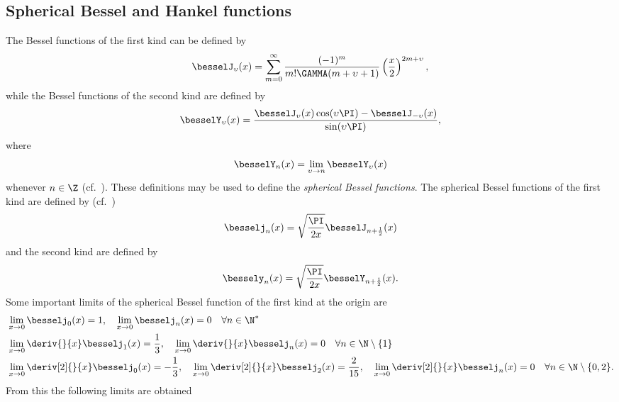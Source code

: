 \subsection{Spherical Bessel and Hankel functions}
\label{subsec:sphericalBesselAndHankel}
The Bessel functions of the first kind can be defined by~\cite[p. 360]{Abramowitz1965hom}
\begin{equation}
	\besselJ_\upsilon(x) = \sum_{m=0}^\infty \frac{(-1)^m}{m! \GAMMA(m+\upsilon+1)}\left(\frac{x}{2}\right)^{2m+\upsilon},
\end{equation}
while the Bessel functions of the second kind are defined by
\begin{equation}
	\besselY_\upsilon(x) = \frac{\besselJ_\upsilon(x) \cos(\upsilon\PI)-\besselJ_{-\upsilon}(x)}{\sin(\upsilon\PI)},
\end{equation}
where
\begin{equation}
	\besselY_n(x) = \lim_{\upsilon\to n} \besselY_\upsilon(x)
\end{equation}
whenever $n\in\Z$ (cf.~\cite[p. 358]{Abramowitz1965hom}). These definitions may be used to define the \textit{spherical Bessel functions}. The spherical Bessel functions of the first kind are defined by (cf.~\cite[p. 437]{Abramowitz1965hom})
\begin{equation}
	\besselj_n(x) = \sqrt{\frac{\PI}{2x}}\besselJ_{n+\frac{1}{2}}(x)
\end{equation}
and the second kind are defined by
\begin{equation}
	\bessely_n(x) = \sqrt{\frac{\PI}{2x}}\besselY_{n+\frac{1}{2}}(x).
\end{equation}
Some important limits of the spherical Bessel function of the first kind at the origin are~\cite[\href{http://functions.wolfram.com/03.21.20.0016.01}{03.21.20.0016.01} and \href{http://functions.wolfram.com/03.21.20.0017.01}{03.21.20.0017.01}]{WolframResearch2016m}
\begin{align}
	&\lim_{x\to 0} \besselj_0(x) = 1,\quad \lim_{x\to 0} \besselj_n(x) = 0 \quad\forall n\in\N^*\\
	&\lim_{x\to 0} \deriv{}{x}\besselj_1(x) = \frac{1}{3},\quad \lim_{x\to 0} \deriv{}{x}\besselj_n(x) = 0 \quad\forall n\in\N\setminus\{1\}\\
	&\lim_{x\to 0} \deriv[2]{}{x}\besselj_0(x) = -\frac{1}{3},\quad\lim_{x\to 0} \deriv[2]{}{x}\besselj_2(x) = \frac{2}{15}, \quad\lim_{x\to 0} \deriv[2]{}{x}\besselj_n(x) = 0 \quad\forall n\in\N\setminus\{0,2\}.
\end{align}
From this the following limits are obtained
